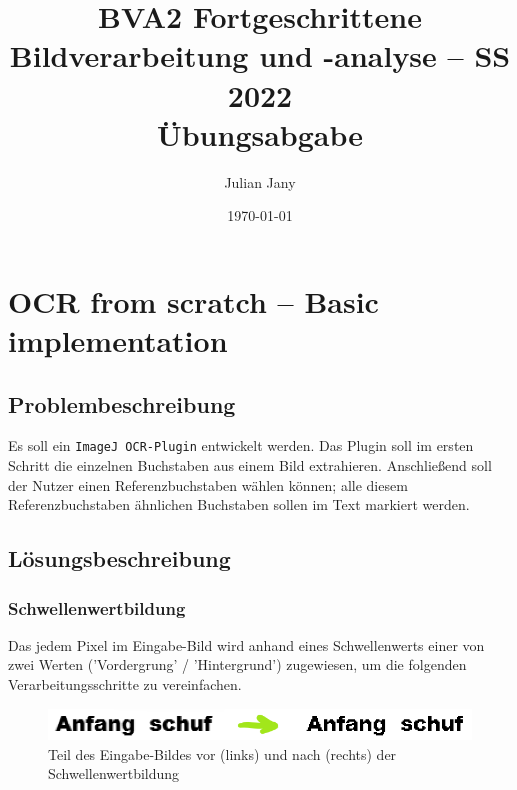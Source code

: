 \documentclass[german,notitlepage,smartquotes]{hgbreport}
\author{Julian Jany}                        %
\title{BVA2 Fortgeschrittene Bildverarbeitung und -analyse -- SS 2022\\ %
				Übungsabgabe \arabic{chapter}}
\date{\today}
\begin{document}
\maketitle



\section{OCR from scratch -- Basic implementation}

\subsection{Problembeschreibung}

Es soll ein \texttt{ImageJ OCR-Plugin} entwickelt werden. Das Plugin soll im ersten Schritt die einzelnen Buchstaben aus einem Bild extrahieren. Anschließend soll der Nutzer einen Referenzbuchstaben wählen können; alle diesem Referenzbuchstaben ähnlichen Buchstaben sollen im Text markiert werden.

\subsection{Lösungsbeschreibung}

\subsubsection{Schwellenwertbildung}

Das jedem Pixel im Eingabe-Bild wird anhand eines Schwellenwerts einer von zwei Werten ('Vordergrung' / 'Hintergrund') zugewiesen, um die folgenden Verarbeitungsschritte zu vereinfachen.

\begin{figure}[h]
\centering
\includegraphics[width=.85\textwidth]{thresholding}
\caption{Teil des Eingabe-Bildes vor (links) und nach (rechts) der Schwellenwertbildung}
\label{fig:thresholding}
\end{figure}
\end{document}
